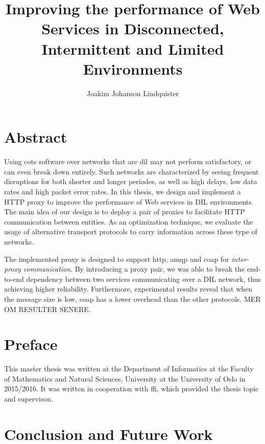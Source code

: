 \documentclass[USenglish]{ifimaster}
\title{Improving the performance of Web Services in Disconnected, Intermittent
and Limited Environments}
\author{Joakim Johanson Lindquister}
\begin{document}
\ififorside{}

\chapter*{Abstract}

Using \gls{cots} software over networks that are \gls{dil} may not perform
satisfactory, or can even break down entirely. Such networks are characterized
by seeing frequent disruptions for both shorter and longer periodes, as well as
high delays, low data rates and high packet error rates. In this thesis, we
design and implement a HTTP proxy to improve the performance of Web services in
DIL environments. The main idea of our design is to deploy a pair of proxies to
facilitate HTTP communication between entities. As an optimization technique, we
evaluate the usage of alternative transport protocols to carry information
across these type of networks.

The implemented proxy is designed to support \gls{http}, \gls{amqp} and
\gls{coap} for \textit{inter-proxy communication}. By introducing a proxy pair,
we was able to break the end-to-end dependency between two services
communicating over a DIL network, thus achieving higher reliability.
Furthermore, experimental results reveal that when the message size is low,
\gls{coap} has a lower overhead than the other protocols. MER OM RESULTER
SENERE.



\chapter*{Preface}

This master thesis was written at the Department of Informatics at the Faculty
of Mathematics and Natural Sciences, University at the University of Oslo in
2015/2016. It was written in cooperation with \gls{ffi}, which provided the
thesis topic and supervison.


\tableofcontents
\listoftables

\glsresetall








\chapter{Conclusion and Future Work}
\label{chapter:conclusion}
\end{document}
